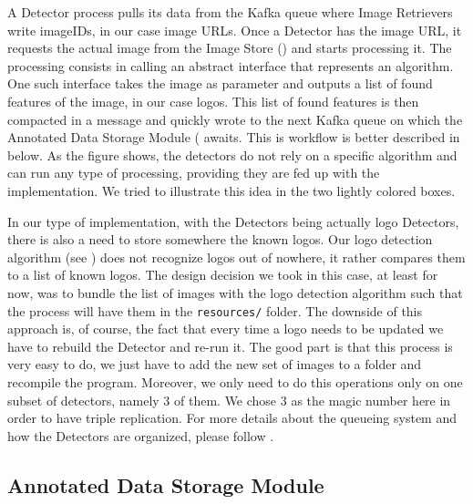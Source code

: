 A Detector process pulls its data from the Kafka queue where Image Retrievers
write imageIDs, in our case image URLs. Once a Detector has the image URL, it
requests the actual image from the Image Store
() and starts processing it. The
processing consists in calling an abstract interface that represents an
algorithm. One such interface takes the image as parameter and outputs a list
of found features of the image, in our case logos. This list of found features
is then compacted in a message and quickly wrote to the next Kafka queue on
which the Annotated Data Storage Module
( awaits. This is workflow is
better described in  below. As the figure
shows, the detectors do not rely on a specific algorithm and can
run any type of processing, providing they are fed up with the implementation.
We tried to illustrate this idea in the two lightly colored boxes.

In our type of implementation, with the Detectors being actually logo
Detectors, there is also a need to store somewhere the known logos. Our logo
detection algorithm (see ) does not
recognize logos out of nowhere, it rather compares them to a list of known
logos. The design decision we took in this case, at least for now, was to
bundle the list of images with the logo detection algorithm such that the
process will have them in the \texttt{resources/} folder. The downside of this
approach is, of course, the fact that every time a logo needs to be updated we
have to rebuild the Detector and re-run it. The good part is that this process
is very easy to do, we just have to add the new set of images to a folder
and recompile the program. Moreover, we only need to do this operations only
on one subset of detectors, namely 3 of them. We chose 3 as the magic number
here in order to have triple replication. For more details about the queueing
system and how the Detectors are organized, please follow
.


\subsection{Annotated Data Storage Module}
\label{sub-sec:ads-module}

